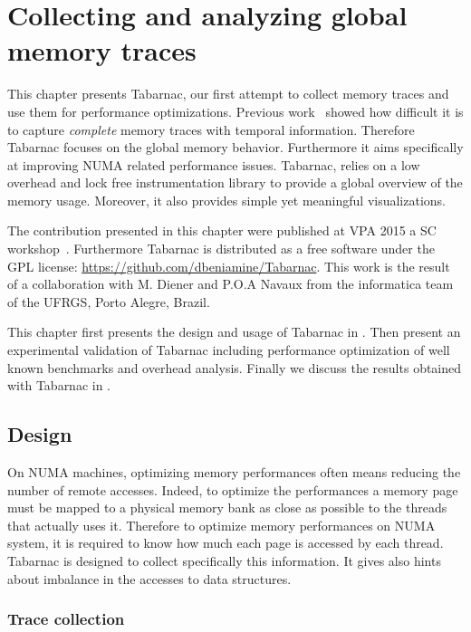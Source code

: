 \chapter{Collecting and analyzing global memory traces}

This chapter presents \gls{Tabarnac}, our first attempt to collect memory traces and use them for performance optimizations.
Previous work~\cite{Beniamine13Cartographier} showed how difficult it is to capture \emph{complete} memory traces with temporal information.
Therefore \gls{Tabarnac} focuses on the global memory behavior.
Furthermore it aims specifically at improving \gls{NUMA} related performance issues.
\gls{Tabarnac}, relies on a low overhead and lock free instrumentation library to provide a global overview of the memory usage.
Moreover,  it also provides simple yet meaningful visualizations.

The contribution presented in this chapter were published at \gls{VPA} 2015 a \gls{SC} workshop~\cite{Beniamine15TABARNAC}.
Furthermore \gls{Tabarnac} is distributed as a free software under the \gls{GPL} license: \url{https://github.com/dbeniamine/Tabarnac}.
This work is the result of a collaboration with M. Diener and P.O.A Navaux from the informatica team of the \gls{UFRGS}, Porto Alegre, Brazil.

This chapter first presents the design and usage of \gls{Tabarnac} in .
Then  present an experimental validation of \gls{Tabarnac} including performance optimization of well known benchmarks and overhead analysis.
Finally we discuss the results obtained with \gls{Tabarnac} in .

\section{Design}
\label{sec:tab-design}

On \gls{NUMA} machines, optimizing memory performances often means reducing the number of remote accesses.
Indeed, to optimize the performances a memory page must be mapped to a physical memory bank as close as possible to the threads that actually uses it.
Therefore to optimize memory performances on \gls{NUMA} system, it is required to know how much each page is accessed by each thread.
\gls{Tabarnac} is designed to collect specifically this information.
It gives also hints about imbalance in the accesses to data structures.

\subsection{Trace collection}

